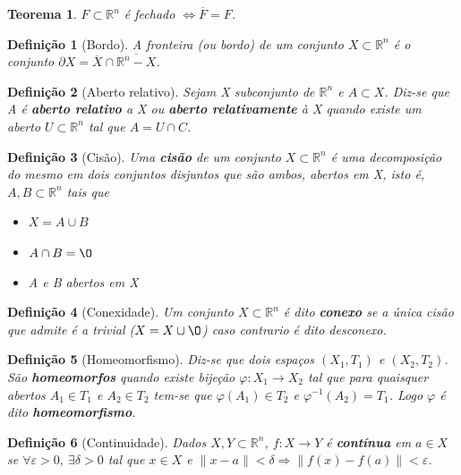 \documentclass[12pt]{article}
\newtheorem{theorem}{Teorema}
\newtheorem{definition}{Definição}
\begin{document}
\begin{theorem}
$F \subset \mathbb{R}^n$ é fechado $\Longleftrightarrow \overline{F} = F$.
\end{theorem}

\begin{definition}[Bordo]
A fronteira (ou bordo) de um conjunto $X \subset \mathbb{R}^n$ é o conjunto $\partial X = \overline{X} \cap \overline{\mathbb{R}^n - X}$.
\end{definition}

\begin{definition}[Aberto relativo]
Sejam X subconjunto de $\mathbb{R}^n$ e $A \subset X$. Diz-se que A é \textbf{aberto relativo} a X ou \textbf{aberto relativamente} à X quando existe um aberto $U \subset \mathbb{R}^n$ tal que $A = U \cap C$.
\end{definition}

\begin{definition}[Cisão]
Uma \textbf{cisão} de um conjunto $X \subset \mathbb{R}^n$ é uma decomposição do mesmo em dois conjuntos disjuntos que são ambos, abertos em X, isto é, $A, B \subset \mathbb{R}^n$ tais que

\begin{itemize}
    \item $X = A \cup B$
    
    \item $A \cap B = \O$
    
    \item A e B abertos em X
\end{itemize}
\end{definition}

\begin{definition}[Conexidade]
Um conjunto $X \subset \mathbb{R}^n$ é dito \textbf{conexo} se a única cisão que admite é a trivial ($X = X \cup \O$) caso contrario é dito desconexo.
\end{definition}

\begin{definition}[Homeomorfismo]
Diz-se que dois espaços $(X_1, T_1)$ e $(X_2, T_2)$. São \textbf{homeomorfos} quando existe bijeção $\varphi: X_1 \rightarrow X_2$ tal que para quaisquer abertos $A_1 \in T_1$ e $A_2 \in T_2$ tem-se que $\varphi(A_1) \in T_2$ e $\varphi^{-1}(A_2) = T_1$. Logo $\varphi$ é dito \textbf{homeomorfismo}.
\end{definition}

\begin{definition}[Continuidade]
Dados $X, Y \subset \mathbb{R}^n$, $f: X \rightarrow Y$ é \textbf{contínua} em $a \in X$ se $\forall \varepsilon > 0,\ \exists \delta > 0$ tal que $x \in X$ e $\| x - a \| < \delta \Rightarrow \| f(x) - f(a) \| < \varepsilon$.
\end{definition}
\end{document}
